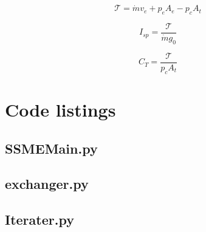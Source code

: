 \documentclass[12pt, Times New Roman]{article}
\begin{document}
    \begin{equation}
        \label{eq:thrust}
        \mathcal{T} = \dot{m} v_{e} + p_{e} A_{e} - p_{c} A_{t}
    \end{equation}

    \begin{equation}
        \label{eq:specific-impulse}
        I_{sp} = \frac{\mathcal{T}}{\dot{m} g_{0}}
    \end{equation}

    \begin{equation}
        \label{eq:thrust-coefficient}
        C_{T} = \frac{\mathcal{T}}{p_{c} A_{t}}
    \end{equation}

    




    \appendix{}
    \section{Code listings}
    \subsection{SSMEMain.py}
    
    \subsection{exchanger.py}
    
    \subsection{Iterater.py}
    
\end{document}
